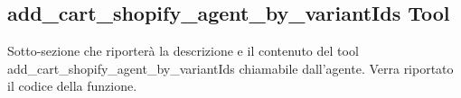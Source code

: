 \subsection{add\_cart\_shopify\_agent\_by\_variantIds Tool}

Sotto-sezione che riporterà la descrizione e il contenuto del tool add\_cart\_shopify\_agent\_by\_variantIds chiamabile dall'agente.
Verra riportato il codice della funzione.